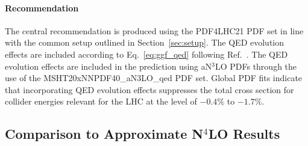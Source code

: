 \paragraph{Recommendation}
The central recommendation is produced using the PDF4LHC21 PDF set in line with the common setup outlined in Section~\ref{sec:setup}.
The QED evolution effects are included according to Eq.~\eqref{eq:ggf_qed} following Ref.~\cite{Cooper-Sarkar:2025sqw}.
The QED evolution effects are included in the prediction using aN$^3$LO PDFs through the use of the MSHT20xNNPDF40\_aN3LO\_qed PDF set.
Global PDF fits indicate that incorporating QED evolution effects suppresses the total cross section for collider energies relevant for the LHC at the level of $-0.4\%$ to $-1.7\%$.


\subsection{Comparison to Approximate N$^4$LO Results}
\label{sec:ggf_n4lo_sv}

